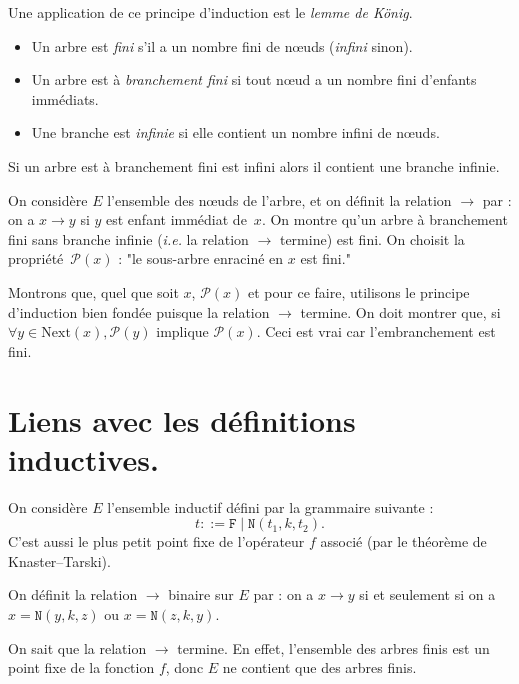 \documentclass[../main]{subfiles}
\begin{document}
  Une application de ce principe d'induction est le \textit{lemme de König}.
  \begin{defn}
    \begin{itemize}
      \item Un arbre est \textit{fini} s'il a un nombre fini de nœuds (\textit{infini} sinon).
      \item Un arbre est à \textit{branchement fini} si tout nœud a un nombre fini d'enfants immédiats.
      \item Une branche est \textit{infinie} si elle contient un nombre infini de nœuds.
    \end{itemize}
  \end{defn}

  \begin{lem}
    Si un arbre est à branchement fini est infini alors il contient une branche infinie.
  \end{lem}

  \begin{prv}
    On considère $E$ l'ensemble des nœuds de l'arbre, et on définit la relation $\to$ par : on a  $x\to y$ si $y$ est enfant immédiat de~$x$.
    On montre qu'un arbre à branchement fini sans branche infinie (\textit{i.e.} la relation $\to$ termine) est fini.
    On choisit la propriété~$\mathcal{P}(x)$ : "le sous-arbre enraciné en $x$ est fini."

    Montrons que, quel que soit $x$, $\mathcal{P}(x)$ et pour ce faire, utilisons le principe d'induction bien fondée puisque la relation $\to$ termine.
    On doit montrer que, si $\forall y \in \mathrm{Next}(x), \mathcal{P}(y)$ implique $\mathcal{P}(x)$.
    Ceci est vrai car l'embranchement est fini.
  \end{prv}


  \section{Liens avec les définitions inductives.}


  On considère $E$ l'ensemble inductif défini par la grammaire suivante :
  \[
  t ::= \mathtt{F}  \mid \mathtt{N}(t_1, k, t_2)
  .\]
  C'est aussi le plus petit point fixe de l'opérateur $f$ associé (par le théorème de Knaster--Tarski).

  On définit la relation $\to$ binaire sur $E$ par : on a $x \to y$ si et seulement si on a $x = \mathtt{N}(y,k,z)$ ou $x = \mathtt{N}(z,k,y)$.

  On sait que la relation $\to$ termine. En effet, l'ensemble des arbres finis est un point fixe de la fonction $f$, donc $E$ ne contient que des arbres finis.
\end{document}

